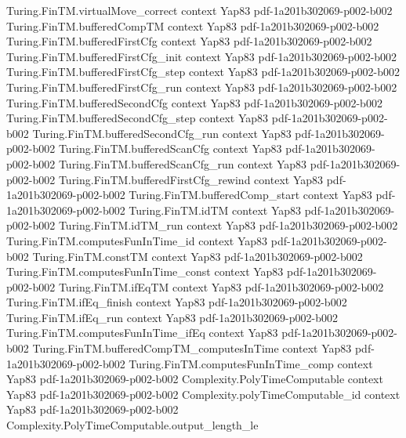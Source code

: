 \begin{theorem}
\proofstep
  {Turing.FinTM.virtualMove_correct}
  {context}
  {Yap83}
  {pdf-1a201b302069-p002-b002}
\proofstep
  {Turing.FinTM.bufferedCompTM}
  {context}
  {Yap83}
  {pdf-1a201b302069-p002-b002}
\proofstep
  {Turing.FinTM.bufferedFirstCfg}
  {context}
  {Yap83}
  {pdf-1a201b302069-p002-b002}
\proofstep
  {Turing.FinTM.bufferedFirstCfg_init}
  {context}
  {Yap83}
  {pdf-1a201b302069-p002-b002}
\proofstep
  {Turing.FinTM.bufferedFirstCfg_step}
  {context}
  {Yap83}
  {pdf-1a201b302069-p002-b002}
\proofstep
  {Turing.FinTM.bufferedFirstCfg_run}
  {context}
  {Yap83}
  {pdf-1a201b302069-p002-b002}
\proofstep
  {Turing.FinTM.bufferedSecondCfg}
  {context}
  {Yap83}
  {pdf-1a201b302069-p002-b002}
\proofstep
  {Turing.FinTM.bufferedSecondCfg_step}
  {context}
  {Yap83}
  {pdf-1a201b302069-p002-b002}
\proofstep
  {Turing.FinTM.bufferedSecondCfg_run}
  {context}
  {Yap83}
  {pdf-1a201b302069-p002-b002}
\proofstep
  {Turing.FinTM.bufferedScanCfg}
  {context}
  {Yap83}
  {pdf-1a201b302069-p002-b002}
\proofstep
  {Turing.FinTM.bufferedScanCfg_run}
  {context}
  {Yap83}
  {pdf-1a201b302069-p002-b002}
\proofstep
  {Turing.FinTM.bufferedFirstCfg_rewind}
  {context}
  {Yap83}
  {pdf-1a201b302069-p002-b002}
\proofstep
  {Turing.FinTM.bufferedComp_start}
  {context}
  {Yap83}
  {pdf-1a201b302069-p002-b002}
\proofstep
  {Turing.FinTM.idTM}
  {context}
  {Yap83}
  {pdf-1a201b302069-p002-b002}
\proofstep
  {Turing.FinTM.idTM_run}
  {context}
  {Yap83}
  {pdf-1a201b302069-p002-b002}
\proofstep
  {Turing.FinTM.computesFunInTime_id}
  {context}
  {Yap83}
  {pdf-1a201b302069-p002-b002}
\proofstep
  {Turing.FinTM.constTM}
  {context}
  {Yap83}
  {pdf-1a201b302069-p002-b002}
\proofstep
  {Turing.FinTM.computesFunInTime_const}
  {context}
  {Yap83}
  {pdf-1a201b302069-p002-b002}
\proofstep
  {Turing.FinTM.ifEqTM}
  {context}
  {Yap83}
  {pdf-1a201b302069-p002-b002}
\proofstep
  {Turing.FinTM.ifEq_finish}
  {context}
  {Yap83}
  {pdf-1a201b302069-p002-b002}
\proofstep
  {Turing.FinTM.ifEq_run}
  {context}
  {Yap83}
  {pdf-1a201b302069-p002-b002}
\proofstep
  {Turing.FinTM.computesFunInTime_ifEq}
  {context}
  {Yap83}
  {pdf-1a201b302069-p002-b002}
\proofstep
  {Turing.FinTM.bufferedCompTM_computesInTime}
  {context}
  {Yap83}
  {pdf-1a201b302069-p002-b002}
\proofstep
  {Turing.FinTM.computesFunInTime_comp}
  {context}
  {Yap83}
  {pdf-1a201b302069-p002-b002}
\proofstep
  {Complexity.PolyTimeComputable}
  {context}
  {Yap83}
  {pdf-1a201b302069-p002-b002}
\proofstep
  {Complexity.polyTimeComputable_id}
  {context}
  {Yap83}
  {pdf-1a201b302069-p002-b002}
\proofstep
  {Complexity.PolyTimeComputable.output_length_le}

\end{theorem}
